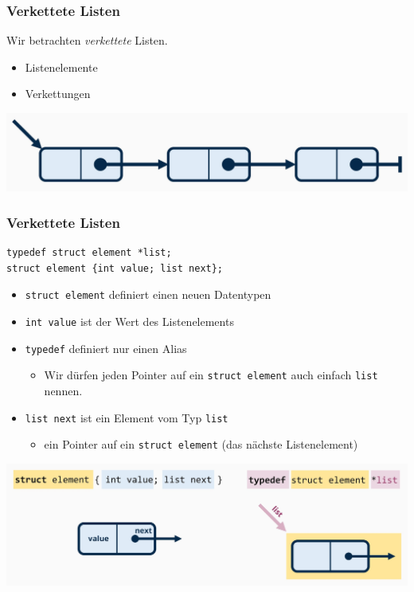 \documentclass{beamer}
\begin{document}
\begin{frame}[fragile] \frametitle{Verkettete Listen}
	Wir betrachten \textit{verkettete} Listen.
	\begin{itemize}
		\item Listenelemente
		\item Verkettungen
	\end{itemize}
	
	\includegraphics[width=\linewidth]{tut06-graphics/tut06-liste.jpg}
\end{frame}
\begin{frame}[fragile] \frametitle{Verkettete Listen}
	\footnotesize
	\begin{lstlisting}[style=notebook]
typedef struct element *list;
struct element {int value; list next};
	\end{lstlisting}
	\begin{itemize}
		\item \lstinline{struct element} definiert einen neuen Datentypen
		\item \lstinline{int value} ist der Wert des Listenelements
		\item \texttt{typedef} definiert nur einen Alias
		\begin{itemize} \scriptsize
			\item Wir dürfen jeden Pointer auf ein \lstinline{struct element} auch einfach \lstinline{list} nennen.
		\end{itemize}
		\item \lstinline{list next} ist ein Element vom Typ \lstinline{list}
		\begin{itemize} \scriptsize
			\item ein Pointer auf ein \lstinline{struct element} (das nächste Listenelement)
		\end{itemize}
	\end{itemize}
	\begin{center}
		\includegraphics[width=.8\linewidth]{tut06-graphics/tut06-liste-impl}
	\end{center}
\end{frame}
\end{document}
